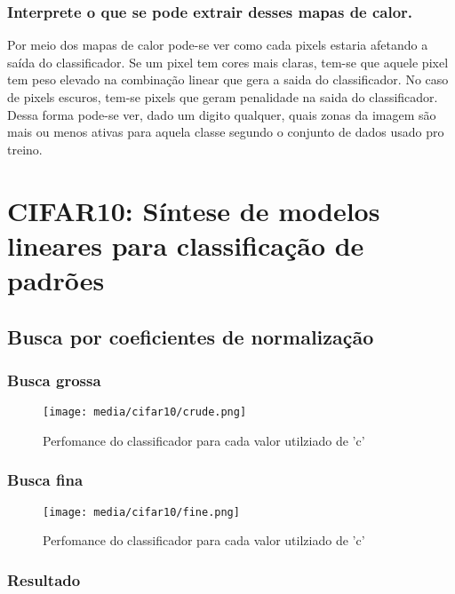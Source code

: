 \documentclass[a4paper]{article}
\begin{document}
\subsubsection{Interprete o que se pode extrair desses mapas de calor.}
Por meio dos mapas de calor pode-se ver como cada pixels estaria afetando a saída do classificador. Se um pixel tem cores mais claras, tem-se que aquele pixel tem peso elevado na combinação linear que gera a saida do classificador. No caso de pixels escuros, tem-se pixels que geram penalidade na saida do classificador. Dessa forma pode-se ver, dado um digito qualquer, quais zonas da imagem são mais ou menos ativas para aquela classe segundo o conjunto de dados usado pro treino.

\section{CIFAR10: Síntese de modelos lineares para classificação de padrões}

\subsection{Busca por coeficientes de normalização}
\subsubsection{Busca grossa}
\begin{figure}[H]
    \centering   %
    \centerline{\texttt{[image: media/cifar10/crude.png]}}
    \caption{Perfomance do classificador para cada valor utilziado de 'c'}  %
    \label{fig:fig1}  %
\end{figure}

\subsubsection{Busca fina}
\begin{figure}[H]
    \centering   %
    \centerline{\texttt{[image: media/cifar10/fine.png]}}
    \caption{Perfomance do classificador para cada valor utilziado de 'c'}  %
    \label{fig:fig2}  %
\end{figure}


\subsubsection{Resultado}
\end{document}
